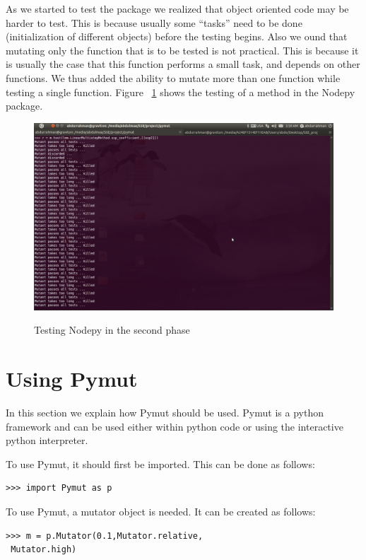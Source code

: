\documentclass{acm_proc_article-sp}
\begin{document}
As we started to test the package we realized that object oriented code may be harder to test. This is because usually some ``tasks'' need to be done (initialization of different objects) before the testing begins. Also we ound that mutating only the function that is to be tested is not practical. This is because it is usually the case that this function performs a small task, and depends on other functions. We thus added the ability to mutate more than one function while testing a single function. Figure ~\ref{ssp} shows the testing of a method in the Nodepy package.

\begin{figure}[h]
\caption{Testing Nodepy in the second phase}
\includegraphics[trim = 0cm 14.9cm 25cm 1.9cm, clip, scale=0.4]{ssp_coef.png}
\label{ssp}
\end{figure}

\section{Using Pymut}

In this section we explain how Pymut should be used. Pymut is a python framework and can be used either within python code or using the interactive python interpreter.

To use Pymut, it should first be imported. This can be done as follows:
\begin{lstlisting}
>>> import Pymut as p
\end{lstlisting}

To use Pymut, a mutator object is needed. It can be created as follows:
\begin{lstlisting}
>>> m = p.Mutator(0.1,Mutator.relative,
 Mutator.high)
\end{lstlisting}
\end{document}
